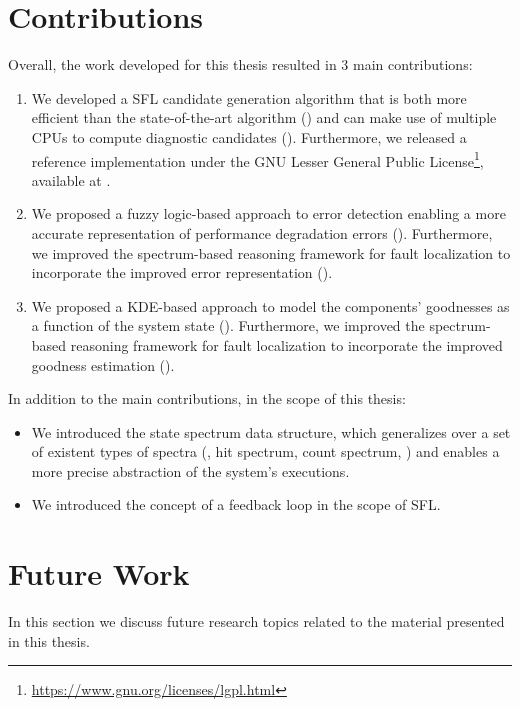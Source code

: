 \section{Contributions}
\label{sec:conclusions:contributions}
Overall, the work developed for this thesis resulted in $3$
main contributions:
\begin{enumerate}
\item We developed a \ac{SFL} candidate generation algorithm that is
  both more efficient than the state-of-the-art algorithm
  () and can make use of multiple
  \acp{CPU} to compute diagnostic candidates
  ().
  Furthermore, we released a reference implementation under the GNU
  Lesser General Public
  License\footnote{\url{https://www.gnu.org/licenses/lgpl.html}},
  available at \mhsIIURL{}.

\item We proposed a fuzzy logic-based approach to error detection
  enabling a more accurate representation of performance degradation
  errors
  ().
  Furthermore, we improved the spectrum-based reasoning framework for
  fault localization to incorporate the improved error representation
  ().

\item We proposed a \ac{KDE}-based approach to model the components'
  goodnesses as a function of the system state
  ().
  Furthermore, we improved the spectrum-based reasoning framework for
  fault localization to incorporate the improved goodness estimation
  ().
\end{enumerate}

In addition to the main contributions, in the scope of this thesis:
\begin{itemize}
\item We introduced the state spectrum data structure, which generalizes
  over a set of existent types of spectra (\eg, hit spectrum, count
  spectrum, \etc) and enables a more precise abstraction of the
  system's executions.
\item We introduced the concept of a feedback loop in the scope of
  \ac{SFL}.
\end{itemize}

\section{Future Work}
In this section we discuss future research topics related to the
material presented in this thesis.


